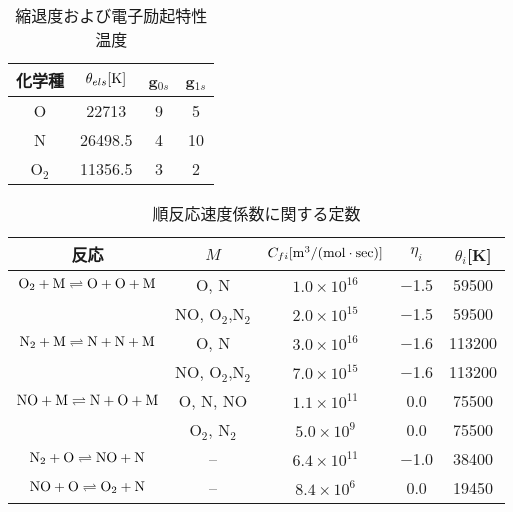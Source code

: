      \begin{table}[!htbp]
      \begin{center}
       \caption{縮退度および電子励起特性温度}
        \begin{tabular}{c c c c} \hline \hline
                        化学種 & $\theta_{els}[{\rm K}]$ & g$_{0s}$ & g$_{1s}$ \\ \hline 
                             O    & 22713   & 9 & 5 \\
                             N    & 26498.5 & 4 & 10\\
                             O$_2$& 11356.5 & 3 & 2 \\ 
                             \hline \hline
        \end{tabular}
       \label{tab:elchatem}
      \end{center}
     \end{table} 

     \begin{table}[!htbp]
      \begin{center}
       \caption{順反応速度係数に関する定数}
        \begin{tabular}{c c c c c} \hline \hline
      反応 & $M$ & $C_{fi}[{\rm m}^{3}/({\rm mol} \cdot {\rm sec})]$ & $\eta_{i}$ & $\theta_{i}$[{\rm K}] \\ \hline 
      ${\rm O}_2+{\rm M} \rightleftharpoons {\rm O}+{\rm O}+{\rm M}$ & O, N          & $1.0\times10^{16}$ &$-$1.5& 59500 \\
                                                                     & NO, O$_2$,N$_2$ & $2.0\times10^{15}$ &$-$1.5& 59500 \\ \hline
      ${\rm N}_2+{\rm M} \rightleftharpoons {\rm N}+{\rm N}+{\rm M}$ & O, N          & $3.0\times10^{16}$ &$-$1.6& 113200 \\
                                                                     & NO, O$_2$,N$_2$ & $7.0\times10^{15}$ &$-$1.6& 113200 \\ \hline
      ${\rm NO}+{\rm M}  \rightleftharpoons {\rm N}+{\rm O}+{\rm M}$ & O, N, NO        & $1.1\times10^{11}$ & 0.0& 75500 \\
                                                                     & O$_2$, N$_2$    & $5.0\times10^{9}$  & 0.0& 75500 \\ \hline
      ${\rm N}_2+{\rm O} \rightleftharpoons {\rm NO}+{\rm N}$        & --   & $6.4\times10^{11}$ &$-$1.0& 38400 \\ \hline
      ${\rm NO}+{\rm O}  \rightleftharpoons {\rm O}_2+{\rm N}$       & --   & $8.4\times10^{6}$  & 0.0& 19450 \\ 
                             \hline \hline
        \end{tabular}
       \label{tab:arrcoef}
      \end{center}
     \end{table} 

